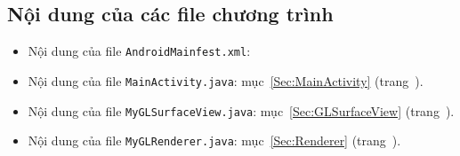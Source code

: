 \documentclass[13pt,a4paper]{extreport}
\begin{document}
\newpage
\subsection{Nội dung của các file chương trình}
	\begin{itemize}
		\item Nội dung của file \verb|AndroidMainfest.xml|:
			
		
		\item Nội dung của file \verb|MainActivity.java|: mục~\ref{Sec:MainActivity} (trang~\pageref{Sec:MainActivity}).
		
		\item Nội dung của file \verb|MyGLSurfaceView.java|: mục~\ref{Sec:GLSurfaceView} (trang~\pageref{Sec:GLSurfaceView}).
		
		\item Nội dung của file \verb|MyGLRenderer.java|: mục~\ref{Sec:Renderer} (trang~\pageref{Sec:Renderer}).


\end{itemize}
\end{document}
